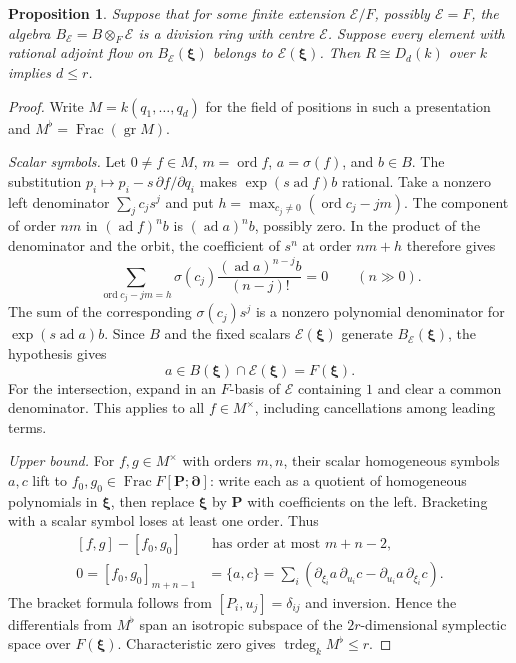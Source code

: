 \documentclass[11pt,a4paper]{article}
\renewcommand{\le}{\leqslant}\renewcommand{\ge}{\geqslant}
\newcommand{\Frac}{\operatorname{Frac}}
\newcommand{\ad}{\operatorname{ad}}
\newcommand{\trdeg}{\operatorname{trdeg}}
\newcommand{\gr}{\operatorname{gr}}
\newtheorem{proposition}[theorem]{Proposition}
\theoremstyle{definition}
\begin{document}
\begin{proposition}\label{prop:bound}
Suppose that for some finite extension \(\mathcal E/F\), possibly \(\mathcal E=F\), the algebra \(B_{\mathcal E}=B\otimes_F\mathcal E\) is a division ring with centre \(\mathcal E\). Suppose every element with rational adjoint flow on \(B_{\mathcal E}(\boldsymbol\xi)\) belongs to \(\mathcal E(\boldsymbol\xi)\). Then \(R\cong D_d(k)\) over \(k\) implies \(d\le r\).
\end{proposition}
\begin{proof}
Write \(M=k(q_1,\ldots,q_d)\) for the field of positions in such a presentation and \(M^\flat=\Frac(\gr M)\).

\emph{Scalar symbols.} Let \(0\ne f\in M\), \(m=\operatorname{ord}f\), \(a=\sigma(f)\), and \(b\in B\). The substitution \(p_i\mapsto p_i-s\,\partial f/\partial q_i\) makes \(\exp(s\ad f)b\) rational. Take a nonzero left denominator \(\sum_j c_js^j\) and put \(h=\max_{c_j\ne0}(\operatorname{ord}c_j-jm)\). The component of order \(nm\) in \((\ad f)^n b\) is \((\ad a)^n b\), possibly zero. In the product of the denominator and the orbit, the coefficient of \(s^n\) at order \(nm+h\) therefore gives
\[
 \sum_{\operatorname{ord}c_j-jm=h}\sigma(c_j)
 \frac{(\ad a)^{n-j}b}{(n-j)!}=0\qquad(n\gg0).
\]
The sum of the corresponding \(\sigma(c_j)s^j\) is a nonzero polynomial denominator for \(\exp(s\ad a)b\). Since \(B\) and the fixed scalars \(\mathcal E(\boldsymbol\xi)\) generate \(B_{\mathcal E}(\boldsymbol\xi)\), the hypothesis gives
\[
 a\in B(\boldsymbol\xi)\cap\mathcal E(\boldsymbol\xi)=F(\boldsymbol\xi).
\]
For the intersection, expand in an \(F\)-basis of \(\mathcal E\) containing \(1\) and clear a common denominator. This applies to all \(f\in M^\times\), including cancellations among leading terms.

\emph{Upper bound.} For \(f,g\in M^\times\) with orders \(m,n\), their scalar homogeneous symbols \(a,c\) lift to \(f_0,g_0\in\Frac F[\mathbf P;\boldsymbol\partial]\): write each as a quotient of homogeneous polynomials in \(\boldsymbol\xi\), then replace \(\boldsymbol\xi\) by \(\mathbf P\) with coefficients on the left. Bracketing with a scalar symbol loses at least one order. Thus
\[
 \begin{aligned}
 [f,g]-[f_0,g_0]&\text{ has order at most }m+n-2,\\
 0=[f_0,g_0]_{m+n-1}
 &=\{a,c\}=\sum_i
   \left(\partial_{\xi_i}a\,\partial_{u_i}c-
         \partial_{u_i}a\,\partial_{\xi_i}c\right).
 \end{aligned}
\]
The bracket formula follows from \([P_i,u_j]=\delta_{ij}\) and inversion. Hence the differentials from \(M^\flat\) span an isotropic subspace of the \(2r\)-dimensional symplectic space over \(F(\boldsymbol\xi)\). Characteristic zero gives \(\trdeg_k M^\flat\le r\).


\end{proof}
\end{document}
